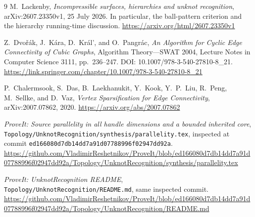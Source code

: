\documentclass[11pt]{article}
\theoremstyle{remark}\newtheorem{remark}[theorem]{Remark}
\DeclareRobustCommand{\code}[1]{\nolinkurl{#1}}
\begin{document}
\begin{thebibliography}{9}
M.~Lackenby, \emph{Incompressible surfaces, hierarchies and unknot recognition}, arXiv:2607.23350v1, 25 July 2026. In particular, the ball-pattern criterion and the hierarchy running-time discussion.\newline
\url{https://arxiv.org/html/2607.23350v1}

Z.~Dvo\v r\'ak, J.~K\'ara, D.~Kr\'al', and O.~Pangr\'ac, \emph{An Algorithm for Cyclic Edge Connectivity of Cubic Graphs}, Algorithm Theory---SWAT 2004, Lecture Notes in Computer Science 3111, pp.~236--247. DOI: 10.1007/978-3-540-27810-8\_21.\newline
\url{https://link.springer.com/chapter/10.1007/978-3-540-27810-8_21}

P.~Chalermsook, S.~Das, B.~Laekhanukit, Y.~Kook, Y.~P.~Liu, R.~Peng, M.~Sellke, and D.~Vaz, \emph{Vertex Sparsification for Edge Connectivity}, arXiv:2007.07862, 2020.\newline
\url{https://arxiv.org/abs/2007.07862}

\emph{ProveIt: Source parallelity in all handle dimensions and a bounded inherited core}, \code{Topology/UnknotRecognition/synthesis/parallelity.tex}, inspected at commit \code{ed166080d7db14dd7a91d07788996f02947dd92a}.\newline
\url{https://github.com/VladimirReshetnikov/ProveIt/blob/ed166080d7db14dd7a91d07788996f02947dd92a/Topology/UnknotRecognition/synthesis/parallelity.tex}

\emph{ProveIt: UnknotRecognition README}, \code{Topology/UnknotRecognition/README.md}, same inspected commit.\newline
\url{https://github.com/VladimirReshetnikov/ProveIt/blob/ed166080d7db14dd7a91d07788996f02947dd92a/Topology/UnknotRecognition/README.md}
\end{thebibliography}
\end{document}
